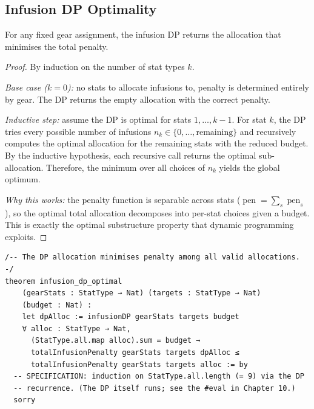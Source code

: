 \documentclass[11pt, a4paper, oneside]{book}
\newcommand{\pen}{\operatorname{pen}}
\begin{document}
\subsection{Infusion DP Optimality}

\begin{lembox}[title={Infusion DP Optimality}]
For any fixed gear assignment, the infusion DP returns the allocation
that minimises the total penalty.
\end{lembox}

\begin{proof}
By induction on the number of stat types $k$.

\emph{Base case ($k = 0$):} no stats to allocate infusions to, penalty is
determined entirely by gear.  The DP returns the empty allocation with the
correct penalty.

\emph{Inductive step:} assume the DP is optimal for stats $1, \ldots, k-1$.
For stat $k$, the DP tries every possible number of infusions
$n_k \in \{0, \ldots, \text{remaining}\}$ and recursively computes the
optimal allocation for the remaining stats with the reduced budget.  By the
inductive hypothesis, each recursive call returns the optimal sub-allocation.
Therefore, the minimum over all choices of $n_k$ yields the global optimum.

\emph{Why this works:} the penalty function is separable across stats
($\pen = \sum_s \pen_s$), so the optimal total allocation decomposes into
per-stat choices given a budget.  This is exactly the optimal substructure
property that dynamic programming exploits.
\end{proof}

\begin{leanbox}[title={Lean 4 --- Infusion DP Optimality (specification)}]
\begin{verbatim}
/-- The DP allocation minimises penalty among all valid allocations. -/
theorem infusion_dp_optimal
    (gearStats : StatType → Nat) (targets : StatType → Nat)
    (budget : Nat) :
    let dpAlloc := infusionDP gearStats targets budget
    ∀ alloc : StatType → Nat,
      (StatType.all.map alloc).sum = budget →
      totalInfusionPenalty gearStats targets dpAlloc ≤
      totalInfusionPenalty gearStats targets alloc := by
  -- SPECIFICATION: induction on StatType.all.length (= 9) via the DP
  -- recurrence. (The DP itself runs; see the #eval in Chapter 10.)
  sorry
\end{verbatim}
\end{leanbox}
\end{document}
